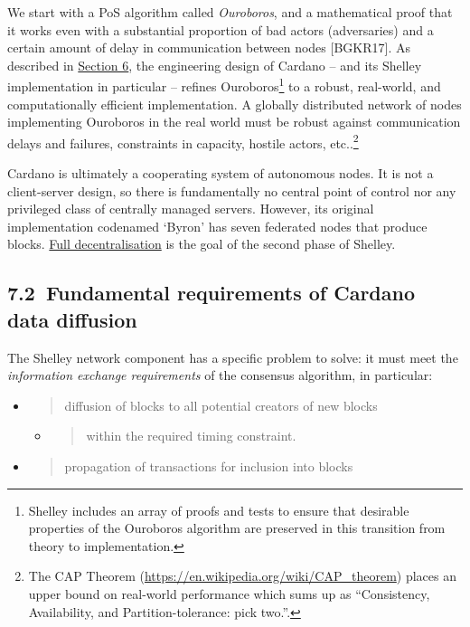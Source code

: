 \documentclass[11pt,a4paper]{article}
\begin{document}
We start with a PoS algorithm called \emph{Ouroboros}, and a
mathematical proof that it works even with a substantial proportion of
bad actors (adversaries) and a certain amount of delay in communication
between nodes {[}BGKR17{]}. As described in
\protect\hyperlink{overview}{{Section 6}}, the engineering design of
Cardano -- and its Shelley implementation in particular -- refines
Ouroboros\footnote{Shelley includes an array of proofs and tests to
  ensure that desirable properties of the Ouroboros algorithm are
  preserved in this transition from theory to implementation.} to a
robust, real-world, and computationally efficient implementation. A
globally distributed network of nodes implementing Ouroboros in the real
world must be robust against communication delays and failures,
constraints in capacity, hostile actors, etc..\footnote{The CAP Theorem
  (\href{https://en.wikipedia.org/wiki/CAP_theorem}{{https://en.wikipedia.org/wiki/CAP\_theorem}})
  places an upper bound on real-world performance which sums up as
  ``Consistency, Availability, and Partition-tolerance: pick two.''.}

Cardano is ultimately a cooperating system of autonomous nodes. It is
not a client-server design, so there is fundamentally no central point
of control nor any privileged class of centrally managed servers.
However, its original implementation codenamed `Byron' has seven
federated nodes that produce blocks.
\protect\hyperlink{decentralisation-design}{{Full decentralisation}} is
the goal of the second phase of Shelley.

\hypertarget{fundamental-requirements-of-cardano-data-diffusion}{%
\subsection{​7.2​~Fundamental requirements of Cardano data
diffusion}\label{fundamental-requirements-of-cardano-data-diffusion}}

The Shelley network component has a specific problem to solve: it must
meet the \emph{information exchange requirements} of the consensus
algorithm, in particular:

\begin{itemize}
\item
  \begin{quote}
  diffusion of blocks to all potential creators of new blocks
  \end{quote}

  \begin{itemize}
  \item
    \begin{quote}
    within the required timing constraint.
    \end{quote}
  \end{itemize}
\item
  \begin{quote}
  propagation of transactions for inclusion into blocks
  \end{quote}
\end{itemize}
\end{document}
